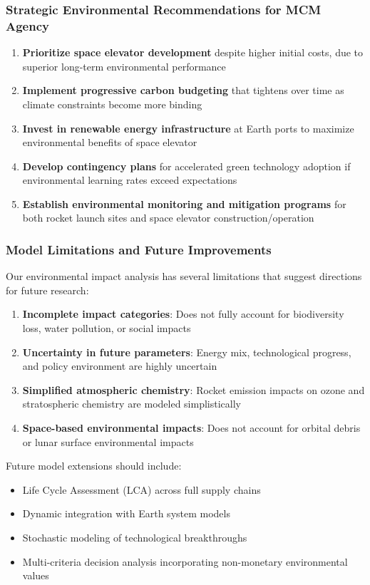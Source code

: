 \documentclass{mcmthesis}
\begin{document}
\subsubsection{Strategic Environmental Recommendations for MCM Agency}

\begin{enumerate}
    \item \textbf{Prioritize space elevator development} despite higher initial costs, due to superior long-term environmental performance
    \item \textbf{Implement progressive carbon budgeting} that tightens over time as climate constraints become more binding
    \item \textbf{Invest in renewable energy infrastructure} at Earth ports to maximize environmental benefits of space elevator
    \item \textbf{Develop contingency plans} for accelerated green technology adoption if environmental learning rates exceed expectations
    \item \textbf{Establish environmental monitoring and mitigation programs} for both rocket launch sites and space elevator construction/operation
\end{enumerate}

\subsubsection{Model Limitations and Future Improvements}

Our environmental impact analysis has several limitations that suggest directions for future research:

\begin{enumerate}
    \item \textbf{Incomplete impact categories}: Does not fully account for biodiversity loss, water pollution, or social impacts
    \item \textbf{Uncertainty in future parameters}: Energy mix, technological progress, and policy environment are highly uncertain
    \item \textbf{Simplified atmospheric chemistry}: Rocket emission impacts on ozone and stratospheric chemistry are modeled simplistically
    \item \textbf{Space-based environmental impacts}: Does not account for orbital debris or lunar surface environmental impacts
\end{enumerate}

Future model extensions should include:
\begin{itemize}
    \item Life Cycle Assessment (LCA) across full supply chains
    \item Dynamic integration with Earth system models
    \item Stochastic modeling of technological breakthroughs
    \item Multi-criteria decision analysis incorporating non-monetary environmental values
\end{itemize}
\end{document}
